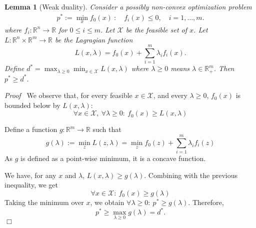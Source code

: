\documentclass[11pt]{article}
\newenvironment{proof}{\noindent\emph{Proof\ }}{\hspace*{\fill}$\Box$\medskip}
\newtheorem{lemma}{Lemma}
\begin{document}
\setcounter{lemma}{-1}
\begin{lemma}[Weak duality]
Consider a possibly non-convex optimization problem
\begin{align*}
p^{*} := \min_{x} f_{0}(x) ~: \quad f_{i}(x) \leq 0, \quad i=1,\ldots,m. 
\end{align*}
where $f_{i}: \mathbb{R}^{n} \rightarrow \mathbb{R}$ for $0 \leq i \leq m$.
Let $\mathcal{X}$ be the feasible set of $x$. 
Let $L: \mathbb{R}^{n} \times \mathbb{R}^{m} \rightarrow \mathbb{R}$ be the Lagragian function
$$
L(x,\lambda) = f_{0}(x) + \sum_{i=1}^{m} \lambda_{i} f_{i}(x).
$$
Define $d^{*} = \max_{\lambda \geq 0} \min_{x \in \mathcal{X}} L(x,\lambda)$
where $\lambda \geq 0$ means $\lambda \in \mathbb{R}^{m}_{+}$. 
Then $p^{*} \geq d^{*}$.
\end{lemma}
\begin{proof}
We observe that, for every feasible $x \in \mathcal{X}$, and every $\lambda \geq 0$,
$f_{0}(x)$ is bounded below by $L(x,\lambda)$:
$$
\forall x \in \mathcal{X}, ~\forall \lambda \geq 0: ~ f_{0}(x) \geq L(x,\lambda)
$$

Define a function $g: \mathbb{R}^{m} \rightarrow \mathbb{R}$ such that
$$
g(\lambda) := \min_{z} L(z,\lambda) = \min_{z} f_{0}(z) + \sum_{i=1}^{m} \lambda_{i} f_{i}(z)
$$
As $g$ is defined as a point-wise minimum, it is a concave function.  

We have, for any $x$ and $\lambda$, $L(x,\lambda) \geq g(\lambda)$. Combining with 
the previous inequality, we get 
$$
\forall x \in \mathcal{X}: ~ f_{0}(x) \geq g(\lambda)
$$
Taking the minimum over $x$, we obtain
$
\forall \lambda \geq 0: ~ p^{*} \geq g(\lambda).
$
Therefore,
$$
p^{*} \geq \max_{\lambda \geq 0} g(\lambda) = d^{*}.
$$
\end{proof}
\end{document}
